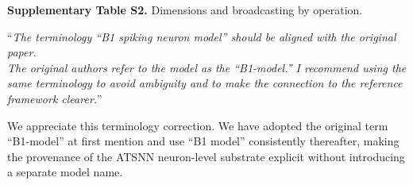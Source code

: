 \documentclass[12pt,technote,onecolumn]{IEEEtran}
\newcommand{\ResponseTableFormat}{%
  \footnotesize
  \renewcommand{\arraystretch}{1.2}%
  \setlength{\tabcolsep}{4pt}%
}
\begin{document}
\noindent\begin{minipage}{\linewidth}
\smallskip\noindent\textbf{Supplementary Table S2.} Dimensions and broadcasting by operation.
\begin{center}
{\ResponseTableFormat
{}
}
\end{center}
\end{minipage}\par\medskip

\vspace{4mm}

``{\it The terminology ``B1 spiking neuron model'' should be aligned with the
original paper.\\
The original authors refer to the model as the ``B1-model.'' I recommend
using the same terminology to avoid ambiguity and to make the connection
to the reference framework clearer.}''
\vspace{1mm}


We appreciate this terminology correction. We have adopted the original term ``B1-model'' at first mention and use ``B1 model'' consistently thereafter, making the provenance of the ATSNN neuron-level substrate explicit without introducing a separate model name.
\end{document}
